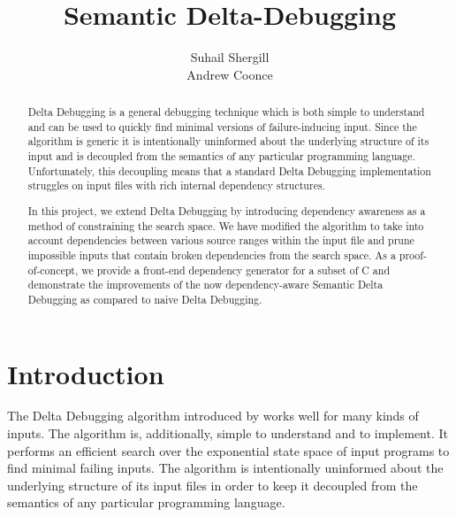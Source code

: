 \documentclass[preprint]{acm_proc_article-sp}
\begin{document}
\title{Semantic Delta-Debugging}


\author{
\alignauthor
Suhail Shergill\\
\alignauthor
Andrew Coonce\\
}

\date{}

\maketitle
\begin{abstract}
Delta Debugging is a general debugging technique which is both simple to
understand and can be used to quickly find minimal versions of failure-inducing
input. Since the algorithm is generic it is intentionally uninformed about the
underlying structure of its input and is decoupled from the semantics of any
particular programming language. Unfortunately, this decoupling means that a
standard Delta Debugging implementation struggles on input files with rich
internal dependency structures.

In this project, we extend Delta Debugging by introducing dependency awareness
as a method of constraining the search space. We have modified the algorithm to
take into account dependencies between various source ranges within the input
file and prune impossible inputs that contain broken dependencies from the
search space. As a proof-of-concept, we provide a front-end dependency generator
for a subset of C and demonstrate the improvements of the now dependency-aware
Semantic Delta Debugging as compared to naive Delta Debugging.
\end{abstract}




\section{Introduction}
\label{sec:intro}

The Delta Debugging algorithm introduced by \citet{dd} works well for many kinds
of inputs. The algorithm is, additionally, simple to understand and to
implement. It performs an efficient search over the exponential state space of
input programs to find minimal failing inputs. The algorithm is intentionally
uninformed about the underlying structure of its input files in order to keep it
decoupled from the semantics of any particular programming language. 
\end{document}
